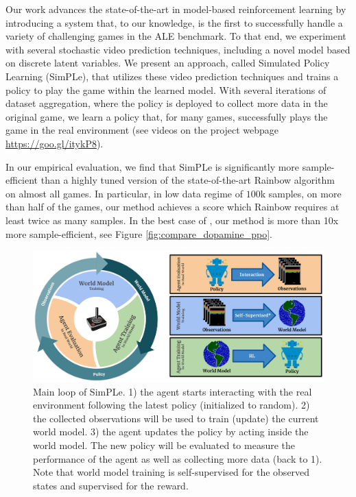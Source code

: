 Our work advances the state-of-the-art in model-based reinforcement learning by introducing a system that, to our knowledge, is the first to successfully handle a variety of challenging games in the ALE benchmark. To that end, we experiment with several stochastic video prediction techniques, including a novel model based on discrete latent variables. We present an approach, called Simulated Policy Learning (SimPLe), that utilizes these video prediction techniques and trains a policy to play the game within the learned model. With several iterations of dataset aggregation, where the policy is deployed to collect more data in the original game, we learn a policy that, for many games, successfully plays the game in the real environment (see videos on the project webpage \url{https://goo.gl/itykP8}). %

In our empirical evaluation, we find that SimPLe is significantly more sample-efficient than a highly tuned version of the state-of-the-art Rainbow algorithm~\cite{rainbow} on almost all games. In particular, in low data regime of $100$k samples, on more than half of the games, our method achieves a score which Rainbow requires at least twice as many samples. In the best case of {\freeway}, our method is more than 10x more sample-efficient, see Figure \ref{fig:compare_dopamine_ppo}.

\begin{figure}[t]
\centering
\includegraphics[width=1.0\textwidth]{figures/Cycle_full.pdf}
\caption{Main loop of SimPLe. 1) the agent starts interacting with the real environment following the latest policy (initialized to random). 2) the collected observations will be used to train (update) the current world model. 3) the agent updates the policy by acting inside the world model. The new policy will be evaluated to measure the performance of the agent as well as collecting more data (back to 1).  Note that world model training is self-supervised for the observed states and supervised for the reward.}
\label{fig:main_cycle}
\end{figure}
